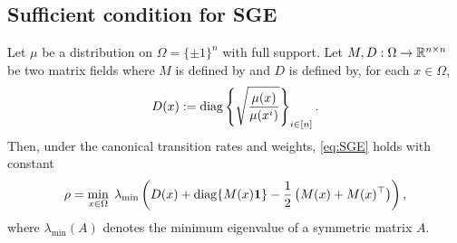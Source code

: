 \subsection{Sufficient condition for SGE} \label{sec:SGE_boolean_hypercube}

\begin{theorem}
\label{thm:SGE_boolean_hypercube}
    Let $\mu$ be a distribution on $\Omega = \{\pm 1\}^n$ with full support. Let $M,D: \Omega \to \mathbb{R}^{n \times n}$ be two matrix fields where $M$ is defined by  and $D$ is defined by, for each $x \in \Omega$,
    \begin{align}\label{eq:def-D}
        D(x) := \mathrm{diag}\left\{\sqrt{\frac{\mu(x)}{\mu(x^i)}}\right\}_{i\in[n]}.
    \end{align}
    Then, under the canonical transition rates and weights, \ref{eq:SGE} holds with constant
    \begin{align*}
        \rho = \min_{x \in \Omega} \;
        \lambda_{\min}\left( D(x) + \mathrm{diag}\{M(x)\boldsymbol{1}\} - \frac{1}{2}\left( M(x) + M(x)^\top \right) \right),
    \end{align*}
    where $\lambda_{\min}(A)$ denotes the minimum eigenvalue of a symmetric matrix $A$.
\end{theorem}

